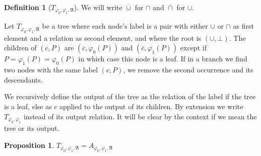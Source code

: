 \documentclass[a4paper,12pt]{article}
\theoremstyle{definition}
\newtheorem{definition}[theorem]{Definition}
\newtheorem{proposition}[theorem]{Proposition}
\renewcommand{\phi}{\varphi}
\newcommand{\mf}{\mathfrak}
\newcommand{\ol}{\overline}
\begin{document}
\begin{definition}[$T_{\phi_{0},\phi_{1},\mf A}$]
We will write $\ol \cup$ for $\cap$ and $\ol \cap$ for $\cup$.

Let $T_{\phi_{0},\phi_{1},\mf A}$ be a tree where each node's label is a pair
with either $\cup$ or $\cap$ as first element and a relation as second
element, and where the root is $(\cup,\bot)$. The children of $(c,P)$ are $(\ol
c,\phi_{0}(P))$ and  $(\ol c,\phi_{1}(P))$ except if $P=\phi_{1}(P)=\phi_{0}(P)$ in
which case this node is a leaf. If in a branch we find two nodes with
the same label $(c,P)$, we remove the second occurrence and its
descendants.

We recursively define the output of the tree as the relation of the
label if the tree is a leaf, else as $c$ applied to the output of its
children. By extension we write $T_{\phi_{0},\phi_{1}}$ instead of its
output relation. It will be clear by the context if we mean the tree
or its output.
\end{definition}
\begin{proposition}\label{eqab}
  $T_{\phi_{0},\phi_{1},\mf A}=A_{\phi_{0},\phi_{1},\mf A}$
\end{proposition}
\end{document}
